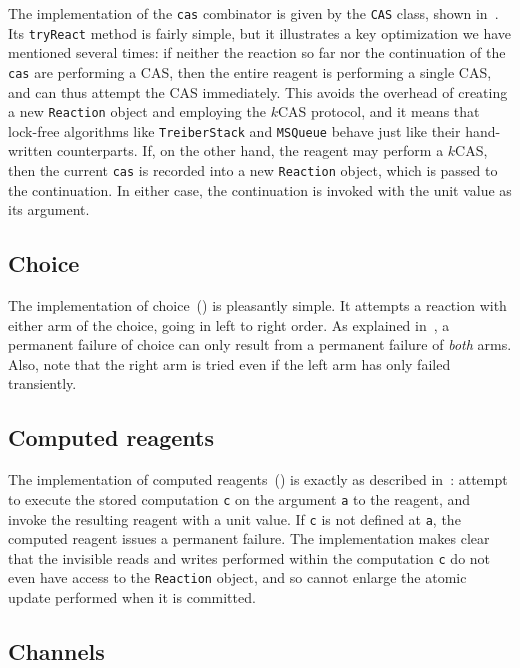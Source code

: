\documentclass[preprint,nocopyrightspace]{sigplanconf}
\begin{document}
The implementation of the \lstinline{cas} combinator is given by the
\lstinline{CAS} class, shown in~.  Its \lstinline{tryReact} method
is fairly simple, but it illustrates a key optimization we have mentioned
several times: if neither the reaction so far nor the continuation of the
\lstinline{cas} are performing a CAS, then the entire reagent is performing a
single CAS, and can thus attempt the CAS immediately.  This avoids the overhead
of creating a new \lstinline{Reaction} object and employing the $k$CAS protocol,
and it means that lock-free algorithms like \lstinline{TreiberStack} and
\lstinline{MSQueue} behave just like their hand-written counterparts.
%
If, on the other hand, the reagent may perform a $k$CAS, then the current
\lstinline{cas} is recorded into a new \lstinline{Reaction} object, which is
passed to the continuation.
%
In either case, the continuation is invoked with the unit value as its argument.

\subsection{Choice}

The implementation of choice~() is pleasantly simple.  It attempts
a reaction with either arm of the choice, going in left to right order.  As
explained in~, a permanent failure of choice can only result from
a permanent failure of \emph{both} arms.  Also, note that the right arm is tried
even if the left arm has only failed transiently.

\subsection{Computed reagents}

The implementation of computed reagents~() is exactly as described
in~: attempt to execute the stored computation \lstinline{c} on
the argument \lstinline{a} to the reagent, and invoke the resulting reagent with
a unit value.  If \lstinline{c} is not defined at \lstinline{a}, the computed
reagent issues a permanent failure.  The implementation makes clear that the
invisible reads and writes performed within the computation \lstinline{c} do not
even have access to the \lstinline{Reaction} object, and so cannot enlarge the
atomic update performed when it is committed.

\subsection{Channels}
\label{sec:impl-channels}
\end{document}

